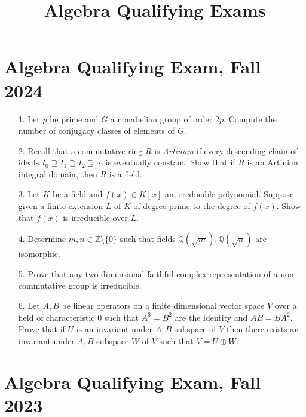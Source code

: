 \documentclass{article}
\title{Algebra Qualifying Exams}
\begin{document}
\maketitle




\section*{Algebra Qualifying Exam, Fall 2024}


\begin{itemize}
    \item[1.] Let \( p \) be prime and \( G \) a nonabelian group of order \( 2p \). Compute the number of conjugacy classes of elements of \( G \).
    
    \item[2.] Recall that a commutative ring \( R \) is \textit{Artinian} if every descending chain of ideals \( I_0 \supseteq I_1 \supseteq I_2 \supseteq \cdots \) is eventually constant. Show that if \( R \) is an Artinian integral domain, then \( R \) is a field.
    
    \item[3.] Let \( K \) be a field and \( f(x) \in K[x] \) an irreducible polynomial. Suppose given a finite extension \( L \) of \( K \) of degree prime to the degree of \( f(x) \). Show that \( f(x) \) is irreducible over \( L \).
    
    \item[4.] Determine \( m, n \in \mathbb{Z} \setminus \{0\} \) such that fields \( \mathbb{Q}(\sqrt{m}), \mathbb{Q}(\sqrt{n}) \) are isomorphic.
    
    \item[5.] Prove that any two dimensional faithful complex representation of a non-commutative group is irreducible.
    
    \item[6.] Let \( A, B \) be linear operators on a finite dimensional vector space \( V \) over a field of characteristic 0 such that \( A^3 = B^2 \) are the identity and \( AB = BA^2 \). Prove that if \( U \) is an invariant under \( A, B \) subspace of \( V \) then there exists an invariant under \( A, B \) subspace \( W \) of \( V \) such that \( V = U \oplus W \).
\end{itemize}


\section*{Algebra Qualifying Exam, Fall 2023}
\end{document}
